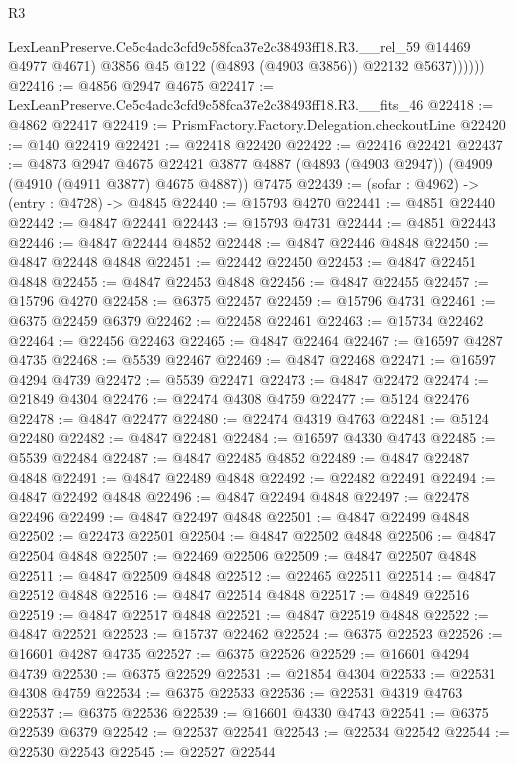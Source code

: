 \begin{lexlean}{R3}
\begin{coremodule}
                LexLeanPreserve.Ce5c4adc3cfd9c58fca37e2c38493ff18.R3.__rel_59 @14469 @4977 @4671)
                @3856
                @45
                @122
                (@4893 (@4903 @3856))
                @22132
                @5637))))))
@22416 := @4856 @2947 @4675
@22417 := LexLeanPreserve.Ce5c4adc3cfd9c58fca37e2c38493ff18.R3.__fits_46
@22418 := @4862 @22417
@22419 := PrismFactory.Factory.Delegation.checkoutLine
@22420 := @140 @22419
@22421 := @22418 @22420
@22422 := @22416 @22421
@22437 := @4873
    @2947
    @4675
    @22421
    @3877
    @4887
    (@4893 (@4903 @2947))
    (@4909 (@4910 (@4911 @3877) @4675 @4887))
    @7475
@22439 := (sofar : @4962) -> (entry : @4728) -> @4845
@22440 := @15793 @4270
@22441 := @4851 @22440
@22442 := @4847 @22441
@22443 := @15793 @4731
@22444 := @4851 @22443
@22446 := @4847 @22444 @4852
@22448 := @4847 @22446 @4848
@22450 := @4847 @22448 @4848
@22451 := @22442 @22450
@22453 := @4847 @22451 @4848
@22455 := @4847 @22453 @4848
@22456 := @4847 @22455
@22457 := @15796 @4270
@22458 := @6375 @22457
@22459 := @15796 @4731
@22461 := @6375 @22459 @6379
@22462 := @22458 @22461
@22463 := @15734 @22462
@22464 := @22456 @22463
@22465 := @4847 @22464
@22467 := @16597 @4287 @4735
@22468 := @5539 @22467
@22469 := @4847 @22468
@22471 := @16597 @4294 @4739
@22472 := @5539 @22471
@22473 := @4847 @22472
@22474 := @21849 @4304
@22476 := @22474 @4308 @4759
@22477 := @5124 @22476
@22478 := @4847 @22477
@22480 := @22474 @4319 @4763
@22481 := @5124 @22480
@22482 := @4847 @22481
@22484 := @16597 @4330 @4743
@22485 := @5539 @22484
@22487 := @4847 @22485 @4852
@22489 := @4847 @22487 @4848
@22491 := @4847 @22489 @4848
@22492 := @22482 @22491
@22494 := @4847 @22492 @4848
@22496 := @4847 @22494 @4848
@22497 := @22478 @22496
@22499 := @4847 @22497 @4848
@22501 := @4847 @22499 @4848
@22502 := @22473 @22501
@22504 := @4847 @22502 @4848
@22506 := @4847 @22504 @4848
@22507 := @22469 @22506
@22509 := @4847 @22507 @4848
@22511 := @4847 @22509 @4848
@22512 := @22465 @22511
@22514 := @4847 @22512 @4848
@22516 := @4847 @22514 @4848
@22517 := @4849 @22516
@22519 := @4847 @22517 @4848
@22521 := @4847 @22519 @4848
@22522 := @4847 @22521
@22523 := @15737 @22462
@22524 := @6375 @22523
@22526 := @16601 @4287 @4735
@22527 := @6375 @22526
@22529 := @16601 @4294 @4739
@22530 := @6375 @22529
@22531 := @21854 @4304
@22533 := @22531 @4308 @4759
@22534 := @6375 @22533
@22536 := @22531 @4319 @4763
@22537 := @6375 @22536
@22539 := @16601 @4330 @4743
@22541 := @6375 @22539 @6379
@22542 := @22537 @22541
@22543 := @22534 @22542
@22544 := @22530 @22543
@22545 := @22527 @22544

\end{coremodule}
\end{lexlean}

